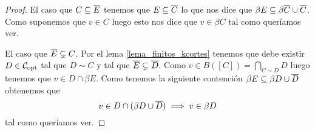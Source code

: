 \documentclass[tesis.tex]{subfiles}
\begin{document}
\begin{proof}
	El caso que $C \subseteq \overline E$ tenemos que $ E \subseteq \overline C$ lo que nos dice que $\beta E \subseteq \beta \overline C \cup \overline C$.
	Como suponemos que $v \in C$ luego esto nos dice que $v \in \beta C$ tal como queríamos ver.
	
	El caso que $\overline E \subsetneq C$.
	Por el lema \ref{lema_finitos_kcortes} tenemos que debe existir $D \in {\cal C}_{\text{opt}}$ tal que $D \sim C$ y tal que $\overline E \subsetneq \overline D$.
	Como $v \in B([C]) = \bigcap_{C \sim D} D $ luego tenemos que $v \in D \cap \beta E$.
	Como tenemos la siguiente contención $\beta E \subseteq \beta D \cup \overline D$ obtenemos que
	\[
		v \in D \cap (\beta D \cup \overline D) \implies v \in \beta D
	\]
	tal como queríamos ver. 
\end{proof}
\end{document}
